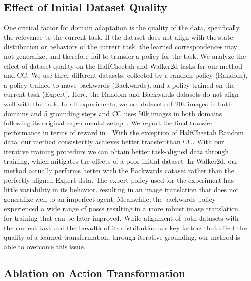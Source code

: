 \subsection{Effect of Initial Dataset Quality}
\label{sec:dataset_analysis}

One critical factor for domain adaptation is the quality of the data, specifically the relevance to the current task.  If the dataset does not align with the state distribution or behaviors of the current task, the learned correspondences may not generalize, and therefore fail to transfer a policy for the task.  We analyze the effect of dataset quality on the HalfCheetah and Walker2d tasks for our method and CC.  We use three different datasets, collected by a random policy (Random), a policy trained to move backwards (Backwards), and a policy trained on the current task (Expert).  Here, the Random and Backwards datasets do not align well with the task.  In all experiments, we use datasets of 20k images in both domains and 5 grounding steps and CC uses 50k images in both domains following its original experimental setup~\citep{zhang2021learning}.  We report the final transfer performance in terms of reward in .  With the exception of HalfCheetah Random data, our method consistently achieves better transfer than CC.  With our iterative training procedure we can obtain better task-aligned data through training, which mitigates the effects of a poor initial dataset.  In Walker2d, our method actually performs better with the Backwards dataset rather than the perfectly aligned Expert data.  The expert policy used for the experiment has little variability in its behavior, resulting in an image translation that does not generalize well to an imperfect agent.  Meanwhile, the backwards policy experienced a wide range of poses resulting in a more robust image translation for training that can be later improved.  While alignment of both datasets with the current task and the breadth of its distribution are key factors that affect the quality of a learned transformation, through iterative grounding, our method is able to overcome this issue.


\subsection{Ablation on Action Transformation}

